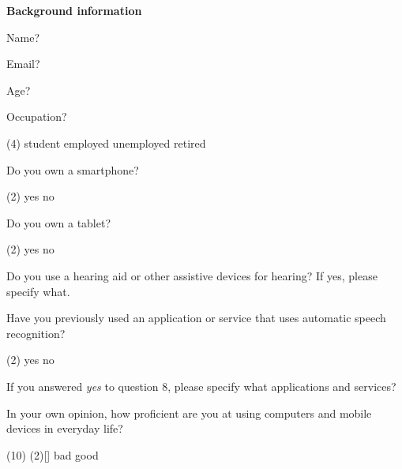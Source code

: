 \documentclass[english, 12pt, a4paper, pdftex, elec, utf8]{aaltothesis}
\begin{document}
{ \footnotesize %
	\noindent
	\hspace{0.35cm}
	\textbf{Background information}
	\vspace{0.15cm} 
	\begin{questionnaire}
		\item Name?
		\item Email?
		\item Age?
		\item Occupation?
		\begin{tasks}[label-width = 2em](4)
			\task student
			\task employed
			\task unemployed
			\task retired
		\end{tasks}
		\item Do you own a smartphone?
		\begin{tasks}[label-width = 2em](2)
			\task yes
			\task no
		\end{tasks}
		\item Do you own a tablet?
		\begin{tasks}[label-width = 2em](2)
			\task yes
			\task no
		\end{tasks}
		\item Do you use a hearing aid or other assistive devices for hearing? If yes, please specify what.
		\item Have you previously used an application or service that uses automatic speech recognition?
		\begin{tasks}[label-width = 2em](2)
			\task yes
			\task no
		\end{tasks}
		\item If you answered \textit{yes} to question 8, please specify what applications and services?
		\item In your own opinion, how proficient are you at using computers and mobile devices in everyday life?
		\begin{tasks}[](10)
			\task*(2)[] bad
			\task[] 1
			\task[] 2
			\task[] 3
			\task[] 4
			\task[] 5
			\task[] 6
			\task[] 7
			\task[] good \\\\
		\end{tasks}

\end{questionnaire}}
\end{document}
